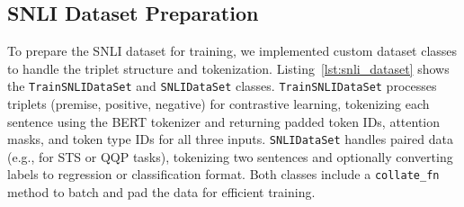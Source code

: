 \subsection{SNLI Dataset Preparation}
To prepare the SNLI dataset for training, we implemented custom dataset classes to handle the triplet structure and tokenization. Listing~\ref{lst:snli_dataset} shows the \texttt{TrainSNLIDataSet} and \texttt{SNLIDataSet} classes. \texttt{TrainSNLIDataSet} processes triplets (premise, positive, negative) for contrastive learning, tokenizing each sentence using the BERT tokenizer and returning padded token IDs, attention masks, and token type IDs for all three inputs. \texttt{SNLIDataSet} handles paired data (e.g., for STS or QQP tasks), tokenizing two sentences and optionally converting labels to regression or classification format. Both classes include a \texttt{collate\_fn} method to batch and pad the data for efficient training.

